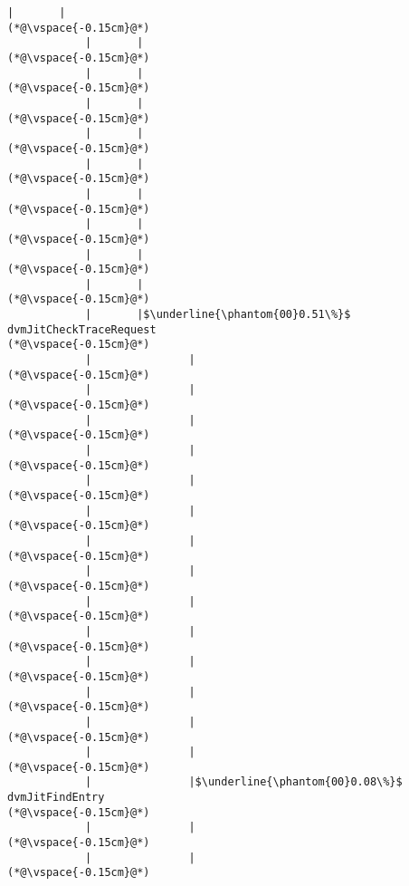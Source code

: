 \begin{lstlisting}[caption=Staattinen metodi Java$\to$C , label=profile:J2CBenchmark00001, numberbychapter=true, frame=lines, float, floatplacement=t]
            |       |
(*@\vspace{-0.15cm}@*)
            |       |
(*@\vspace{-0.15cm}@*)
            |       |
(*@\vspace{-0.15cm}@*)
            |       |
(*@\vspace{-0.15cm}@*)
            |       |
(*@\vspace{-0.15cm}@*)
            |       |
(*@\vspace{-0.15cm}@*)
            |       |
(*@\vspace{-0.15cm}@*)
            |       |
(*@\vspace{-0.15cm}@*)
            |       |
(*@\vspace{-0.15cm}@*)
            |       |
(*@\vspace{-0.15cm}@*)
            |       |$\underline{\phantom{00}0.51\%}$ dvmJitCheckTraceRequest
(*@\vspace{-0.15cm}@*)
            |               |
(*@\vspace{-0.15cm}@*)
            |               |
(*@\vspace{-0.15cm}@*)
            |               |
(*@\vspace{-0.15cm}@*)
            |               |
(*@\vspace{-0.15cm}@*)
            |               |
(*@\vspace{-0.15cm}@*)
            |               |
(*@\vspace{-0.15cm}@*)
            |               |
(*@\vspace{-0.15cm}@*)
            |               |
(*@\vspace{-0.15cm}@*)
            |               |
(*@\vspace{-0.15cm}@*)
            |               |
(*@\vspace{-0.15cm}@*)
            |               |
(*@\vspace{-0.15cm}@*)
            |               |
(*@\vspace{-0.15cm}@*)
            |               |
(*@\vspace{-0.15cm}@*)
            |               |
(*@\vspace{-0.15cm}@*)
            |               |$\underline{\phantom{00}0.08\%}$ dvmJitFindEntry
(*@\vspace{-0.15cm}@*)
            |               |
(*@\vspace{-0.15cm}@*)
            |               |
(*@\vspace{-0.15cm}@*)

\end{lstlisting}
